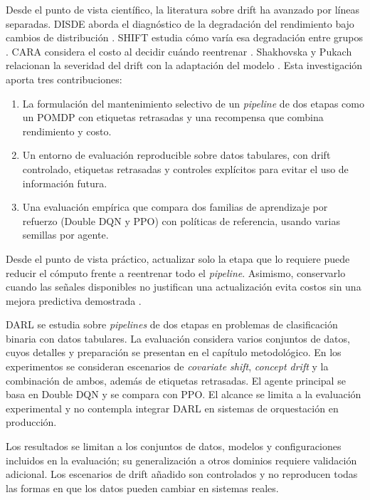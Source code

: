 
Desde el punto de vista científico, la literatura sobre drift ha avanzado por líneas
separadas. DISDE aborda el diagnóstico de la degradación del rendimiento bajo cambios de
distribución \cite{cai2023disde}. SHIFT estudia cómo varía esa degradación entre grupos
\cite{singh2025shift}. CARA considera el costo al decidir cuándo reentrenar
\cite{mahadevan2024cost}. Shakhovska y Pukach relacionan la severidad del drift con la
adaptación del modelo \cite{shakhovska2025severity}. Esta
investigación aporta tres contribuciones:

\begin{enumerate}
    \item La formulación del mantenimiento selectivo de un \textit{pipeline} de dos etapas
          como un POMDP con etiquetas retrasadas y una recompensa que combina rendimiento y costo.
    \item Un entorno de evaluación reproducible sobre datos tabulares, con drift controlado,
          etiquetas retrasadas y controles explícitos para evitar el uso de información futura.
    \item Una evaluación empírica que compara dos familias de aprendizaje por refuerzo
          (Double DQN y PPO) con políticas de referencia, usando varias semillas por agente.
\end{enumerate}

Desde el punto de vista práctico, actualizar solo la etapa que lo requiere puede reducir
el cómputo frente a reentrenar todo el \textit{pipeline}. Asimismo, conservarlo cuando las
señales disponibles no justifican una actualización evita costos sin una mejora predictiva
demostrada \cite{mahadevan2024cost}.



DARL se estudia sobre \textit{pipelines} de dos etapas en problemas de clasificación binaria
con datos tabulares. La evaluación
considera varios conjuntos de datos, cuyos detalles y preparación se presentan en el
capítulo metodológico. En los experimentos se consideran escenarios de
\textit{covariate shift}, \textit{concept drift} y la combinación de ambos, además de
etiquetas retrasadas. El agente principal se basa en Double DQN y se compara con PPO. El
alcance se limita a la evaluación experimental y no contempla integrar DARL en sistemas de
orquestación en producción.



Los resultados se limitan a los conjuntos de datos, modelos y configuraciones incluidos en
la evaluación; su generalización a otros dominios requiere validación adicional. Los
escenarios de drift añadido son controlados y no reproducen todas las formas en que los
datos pueden cambiar en sistemas reales.

